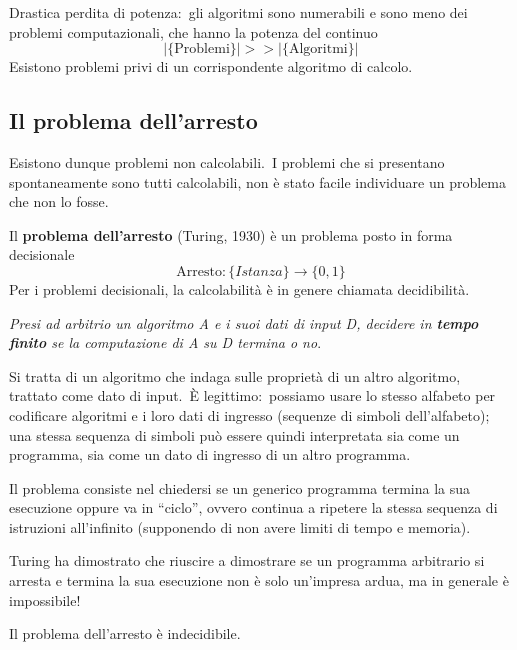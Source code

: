 Drastica perdita di potenza:\ gli algoritmi sono numerabili e sono meno dei problemi computazionali, che hanno la potenza del continuo
\[|\{\mathrm{Problemi}\}|  > >  |\{\mathrm{Algoritmi}\}|\]
Esistono problemi privi di un corrispondente algoritmo di calcolo.\

\subsection{Il problema dell'arresto}

Esistono dunque problemi non calcolabili.\
I problemi che si presentano spontaneamente sono tutti calcolabili, non è stato facile individuare un problema che non lo fosse.\

Il \textbf{problema dell'arresto} (Turing, 1930) è un problema posto in forma decisionale
\[\mathrm{Arresto}: \{\mathit{Istanza}\} \rightarrow \{0,1\}\]
Per i problemi decisionali, la calcolabilità è in genere chiamata decidibilità.\

\vspace{12pt}

\noindent\textit{Presi ad arbitrio un algoritmo A e i suoi dati di input D, decidere in \textbf{tempo finito} se la computazione di A su D termina o no}.

\vspace{12pt}

\noindent Si tratta di un algoritmo che indaga sulle proprietà di un altro algoritmo, trattato come dato di input.\
È legittimo:\ possiamo usare lo stesso alfabeto per codificare algoritmi e i loro dati di ingresso (sequenze di simboli dell'alfabeto); una stessa sequenza di simboli può essere quindi interpretata sia come un programma, sia come un dato di ingresso di un altro programma.\

Il problema consiste nel chiedersi se un generico programma termina la sua esecuzione oppure va in ``ciclo'', ovvero continua a ripetere la stessa sequenza di istruzioni all'infinito (supponendo di non avere limiti di tempo e memoria).\

Turing ha dimostrato che riuscire a dimostrare se un programma arbitrario si arresta e termina la sua esecuzione non è solo un'impresa ardua, ma in generale è impossibile!

\begin{theorem}
    Il problema dell'arresto è indecidibile.\
\end{theorem}

